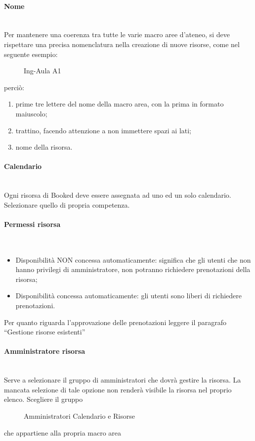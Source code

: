 \paragraph*{Nome}\mbox{}\\ %
Per mantenere una coerenza tra tutte le varie macro aree d'ateneo, si deve rispettare una precisa
nomenclatura nella creazione di nuove risorse, come nel seguente esempio:
\begin{figure}[H]
\centering{}Ing-Aula A1
\normalsize
\end{figure}
perciò:
\begin{enumerate}
 \item prime tre lettere del nome della macro area, con la prima in formato maiuscolo;
 \item trattino, facendo attenzione a non immettere spazi ai lati;
 \item nome della risorsa.
\end{enumerate}

\paragraph*{Calendario}\mbox{}\\ %
Ogni risorsa di Booked deve essere assegnata ad uno ed un solo calendario.
Selezionare quello di propria competenza.

\paragraph*{Permessi risorsa}\mbox{}\\ %
\begin{itemize}
 \item Disponibilità NON concessa automaticamente: significa che gli utenti che non hanno privilegi
 di amministratore, non potranno richiedere prenotazioni della risorsa;
 \item Disponibilità concessa automaticamente: gli utenti sono liberi di richiedere prenotazioni.
\end{itemize}
Per quanto riguarda l'approvazione delle prenotazioni leggere il paragrafo
``Gestione risorse esistenti''

\paragraph*{Amministratore risorsa}\mbox{}\\ %
Serve a selezionare il gruppo di amministratori che dovrà gestire la risorsa. La mancata selezione
di tale opzione non renderà visibile la risorsa nel proprio elenco.
Scegliere il gruppo
\begin{figure}[H]
\centering{}Amministratori Calendario e Risorse
\normalsize
\end{figure}
che appartiene alla propria macro area


